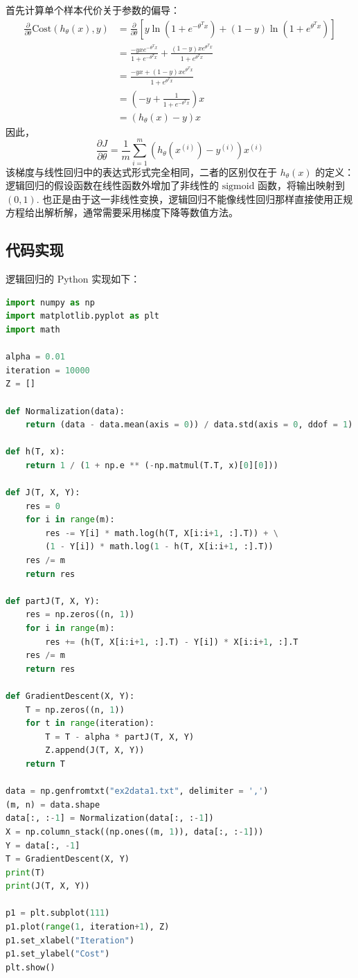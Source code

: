 首先计算单个样本代价关于参数的偏导：
\begin{align*}
\frac{\partial}{\partial\theta}\text{Cost}(h_\theta(x), y)&=\frac{\partial}{\partial \theta}\left[y\ln\left(1+e^{-\theta^Tx}\right)+(1-y)\ln\left(1+e^{\theta^Tx}\right)\right]\\
&=\frac{-yxe^{-\theta^Tx}}{1+e^{-\theta^Tx}}+\frac{(1-y)xe^{\theta^T x}}{1+e^{\theta^T x}}\\
&=\frac{-yx+(1-y)xe^{\theta^Tx}}{1+e^{\theta^Tx}}\\
&=\left(-y+\frac{1}{1+e^{-\theta^Tx}}\right)x\\
&=(h_\theta(x)-y)x
\end{align*}
因此，
\[
\frac{\partial J}{\partial\theta}=\frac{1}{m}\sum_{i=1}^m\left(h_\theta(x^{(i)})-y^{(i)}\right)x^{(i)}
\]
该梯度与线性回归中的表达式形式完全相同，二者的区别仅在于 $h_\theta(x)$ 的定义：逻辑回归的假设函数在线性函数外增加了非线性的 $\text{sigmoid}$ 函数，将输出映射到 $(0,1)$. 也正是由于这一非线性变换，逻辑回归不能像线性回归那样直接使用正规方程给出解析解，通常需要采用梯度下降等数值方法。


\subsection{代码实现}

逻辑回归的 Python 实现如下：

\begin{lstlisting}[language=Python]
import numpy as np
import matplotlib.pyplot as plt
import math

alpha = 0.01
iteration = 10000
Z = []

def Normalization(data):
	return (data - data.mean(axis = 0)) / data.std(axis = 0, ddof = 1)

def h(T, x):
	return 1 / (1 + np.e ** (-np.matmul(T.T, x)[0][0]))

def J(T, X, Y):
	res = 0
	for i in range(m):
		res -= Y[i] * math.log(h(T, X[i:i+1, :].T)) + \
		(1 - Y[i]) * math.log(1 - h(T, X[i:i+1, :].T))
	res /= m
	return res

def partJ(T, X, Y):
	res = np.zeros((n, 1))
	for i in range(m):
		res += (h(T, X[i:i+1, :].T) - Y[i]) * X[i:i+1, :].T
	res /= m
	return res

def GradientDescent(X, Y):
	T = np.zeros((n, 1))
	for t in range(iteration):
		T = T - alpha * partJ(T, X, Y)
		Z.append(J(T, X, Y))
	return T

data = np.genfromtxt("ex2data1.txt", delimiter = ',')
(m, n) = data.shape
data[:, :-1] = Normalization(data[:, :-1])
X = np.column_stack((np.ones((m, 1)), data[:, :-1]))
Y = data[:, -1]
T = GradientDescent(X, Y)
print(T)
print(J(T, X, Y))

p1 = plt.subplot(111)
p1.plot(range(1, iteration+1), Z)
p1.set_xlabel("Iteration")
p1.set_ylabel("Cost")
plt.show()
\end{lstlisting}

